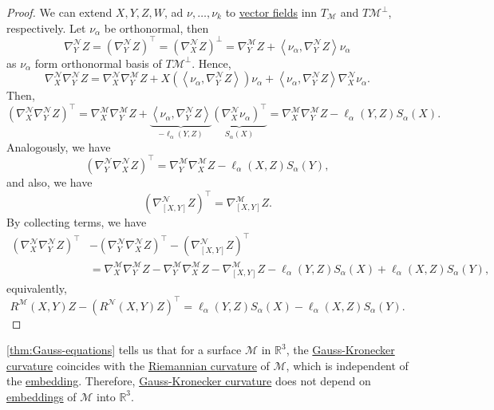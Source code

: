 \begin{proof}
	We can extend \(X, Y, Z, W\), ad \(\nu , \dots , \nu _k\) to \hyperref[def:vector-field]{vector fields} inn \(T_{\mathcal{M} } \) and \(T \mathcal{M} ^{\perp} \), respectively. Let \(\nu _\alpha \) be orthonormal, then
	\[
		\nabla _Y^{\mathcal{N} } Z
		= (\nabla _Y^{\mathcal{N} } Z)^{\top} = (\nabla _X^{\mathcal{N} } Z)^{\perp}
		= \nabla _Y ^\mathcal{M} Z + \left\langle \nu _\alpha , \nabla _Y^{\mathcal{N} } Z \right\rangle \nu _{\alpha }
	\]
	as \(\nu _\alpha \) form orthonormal basis of \(T \mathcal{M} ^{\perp} \). Hence,
	\[
		\nabla _X ^\mathcal{N} \nabla _Y ^\mathcal{N} Z
		= \nabla _X ^{\mathcal{N} }\nabla _Y^{\mathcal{M} }Z + X(\left\langle \nu _\alpha , \nabla _Y^{\mathcal{N} } Z \right\rangle ) \nu _\alpha + \left\langle \nu _\alpha , \nabla _Y^{\mathcal{N} } Z \right\rangle \nabla _X^{\mathcal{N} } \nu _\alpha.
	\]
	Then,
	\[
		(\nabla _X^{\mathcal{N} } \nabla _Y ^{\mathcal{N} }Z)^{\top}
		= \nabla _X ^\mathcal{M} \nabla _Y ^\mathcal{M} Z + \underbrace{\left\langle \nu _\alpha , \nabla _Y ^\mathcal{N} Z \right\rangle}_{-\ell _\alpha (Y, Z)} \underbrace{(\nabla _X ^\mathcal{N} \nu _\alpha )^{\top} }_{S_\alpha (X)}
		= \nabla _X ^\mathcal{M} \nabla _Y ^\mathcal{M} Z - \ell _\alpha (Y, Z) S_\alpha (X).
	\]
	Analogously, we have
	\[
		(\nabla ^\mathcal{N} _Y \nabla ^\mathcal{N} _X Z)^{\top}
		= \nabla _Y ^\mathcal{M} \nabla _X ^\mathcal{M} Z - \ell _\alpha (X, Z) S_\alpha (Y),
	\]
	and also, we have
	\[
		(\nabla ^\mathcal{N} _{[X, Y]} Z)^{\top} = \nabla ^\mathcal{M} _{[X, Y]} Z.
	\]
	By collecting terms, we have
	\[
		\begin{split}
			(\nabla ^\mathcal{N} _X \nabla ^\mathcal{N} _Y Z) ^{\top} &- (\nabla ^\mathcal{N} _Y \nabla ^\mathcal{N} _X Z) ^{\top} - (\nabla ^\mathcal{N} _{[X, Y]} Z) ^{\top}\\
			&= \nabla _X ^\mathcal{M} \nabla _Y ^\mathcal{M} Z - \nabla _Y ^{\mathcal{M} } \nabla _X ^\mathcal{M} Z - \nabla ^\mathcal{M} _{[X, Y]} Z - \ell _\alpha (Y, Z) S_\alpha (X) + \ell _\alpha (X, Z) S_\alpha (Y),
		\end{split}
	\]
	equivalently,
	\[
		R^{\mathcal{M}} (X, Y)Z - (R^{\mathcal{N} } (X, Y)Z)^{\top} = \ell _\alpha (Y, Z)S_\alpha (X) - \ell _\alpha (X, Z)S_{\alpha }(Y).
	\]
\end{proof}

\autoref{thm:Gauss-equations} tells us that for a surface \(\mathcal{M} \) in \(\mathbb{R} ^3\), the \hyperref[def:Gauss-Kronecker-curvature]{Gauss-Kronecker curvature} coincides with the \hyperref[def:Riemannian-curvature]{Riemannian curvature} of \(\mathcal{M} \), which is independent of the \hyperref[def:embedding]{embedding}. Therefore, \hyperref[def:Gauss-Kronecker-curvature]{Gauss-Kronecker curvature} does not depend on \hyperref[def:embedding]{embeddings} of \(\mathcal{M} \) into \(\mathbb{R} ^3\).

